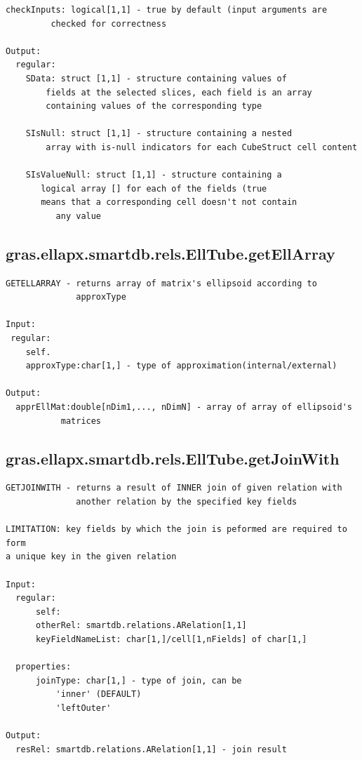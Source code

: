 \documentclass[letterpaper,10pt,english]{sphinxmanual}
\begin{document}
\begin{Verbatim}[commandchars=\\\{\}]
      checkInputs: logical[1,1] - true by default (input arguments are
         checked for correctness

Output:
  regular:
    SData: struct [1,1] - structure containing values of
        fields at the selected slices, each field is an array
        containing values of the corresponding type

    SIsNull: struct [1,1] - structure containing a nested
        array with is-null indicators for each CubeStruct cell content

    SIsValueNull: struct [1,1] - structure containing a
       logical array [] for each of the fields (true
       means that a corresponding cell doesn't not contain
          any value
\end{Verbatim}


\subsection{gras.ellapx.smartdb.rels.EllTube.getEllArray}
\label{chap_functions:gras-ellapx-smartdb-rels-elltube-getellarray}
\begin{Verbatim}[commandchars=\\\{\}]
GETELLARRAY - returns array of matrix's ellipsoid according to
              approxType

Input:
 regular:
    self.
    approxType:char[1,] - type of approximation(internal/external)

Output:
  apprEllMat:double[nDim1,..., nDimN] - array of array of ellipsoid's
           matrices
\end{Verbatim}


\subsection{gras.ellapx.smartdb.rels.EllTube.getJoinWith}
\label{chap_functions:gras-ellapx-smartdb-rels-elltube-getjoinwith}
\begin{Verbatim}[commandchars=\\\{\}]
GETJOINWITH - returns a result of INNER join of given relation with
              another relation by the specified key fields

LIMITATION: key fields by which the join is peformed are required to form
a unique key in the given relation

Input:
  regular:
      self:
      otherRel: smartdb.relations.ARelation[1,1]
      keyFieldNameList: char[1,]/cell[1,nFields] of char[1,]

  properties:
      joinType: char[1,] - type of join, can be
          'inner' (DEFAULT)
          'leftOuter'

Output:
  resRel: smartdb.relations.ARelation[1,1] - join result
\end{Verbatim}
\end{document}
